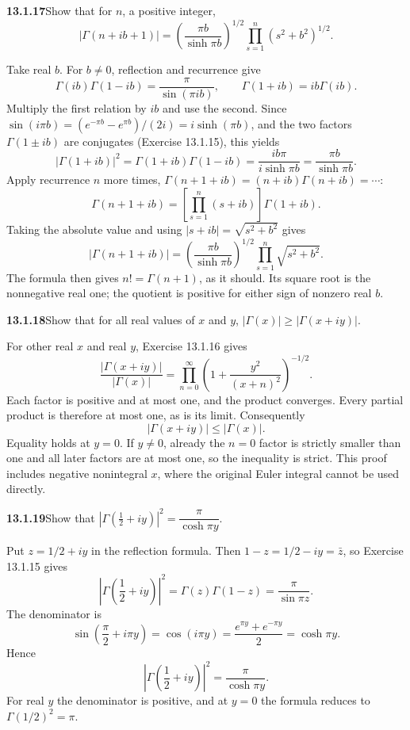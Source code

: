 \par\bigskip
\noindent\textbf{13.1.17}\quad Show that for $n$, a positive integer,
\[
|\Gamma(n+ib+1)|=\left(\frac{\pi b}{\sinh\pi b}\right)^{1/2}
\prod_{s=1}^{n}(s^{2}+b^{2})^{1/2}.
\]
\par\smallskip
{}
\solution
Take real $b$.  For $b\ne0$, reflection and recurrence give
\[
\Gamma(ib)\Gamma(1-ib)=\frac{\pi}{\sin(\pi ib)},
\qquad\Gamma(1+ib)=ib\Gamma(ib).
\]
Multiply the first relation by $ib$ and use the second.  Since
$\sin(i\pi b)=(e^{-\pi b}-e^{\pi b})/(2i)=i\sinh(\pi b)$, and the two
factors $\Gamma(1\pm ib)$ are conjugates (Exercise 13.1.15), this
yields
\[
|\Gamma(1+ib)|^2=\Gamma(1+ib)\Gamma(1-ib)
=\frac{ib\pi}{i\sinh\pi b}
=\frac{\pi b}{\sinh\pi b}.
\]
Apply recurrence $n$ more times,
$\Gamma(n+1+ib)=(n+ib)\Gamma(n+ib)=\cdots$:
\[
\Gamma(n+1+ib)=\left[\prod_{s=1}^n(s+ib)\right]\Gamma(1+ib).
\]
Taking the absolute value and using $|s+ib|=\sqrt{s^2+b^2}$ gives
\[
\boxed{|\Gamma(n+1+ib)|=
\left(\frac{\pi b}{\sinh\pi b}\right)^{1/2}
\prod_{s=1}^n\sqrt{s^2+b^2}}.
\]
  The formula then gives $n!=\Gamma(n+1)$, as it
should.  Its square root is the nonnegative real one; the quotient
is positive for either sign of nonzero real $b$.


\par\bigskip
\noindent\textbf{13.1.18}\quad Show that for all real values of $x$ and $y$,
$|\Gamma(x)|\ge|\Gamma(x+iy)|$.
\par\smallskip
{}
\solution
{}
For other real $x$ and real $y$, Exercise 13.1.16 gives
\[
\frac{|\Gamma(x+iy)|}{|\Gamma(x)|}
=\prod_{n=0}^\infty
\left(1+\frac{y^2}{(x+n)^2}\right)^{-1/2}.
\]
Each factor is positive and at most one, and the product converges.
Every partial product is therefore at most one, as is its limit.
Consequently
\[
\boxed{|\Gamma(x+iy)|\le|\Gamma(x)|}.
\]
Equality holds at $y=0$.  If $y\ne0$, already the $n=0$ factor is
strictly smaller than one and all later factors are at most one, so
the inequality is strict.  This proof includes negative nonintegral
$x$, where the original Euler integral cannot be used directly.


\par\bigskip
\noindent\textbf{13.1.19}\quad Show that
$\left|\Gamma(\tfrac{1}{2}+iy)\right|^{2}=\dfrac{\pi}{\cosh\pi y}$.
\par\smallskip
{}
\solution
Put $z=1/2+iy$ in the reflection formula.  Then
$1-z=1/2-iy=\bar z$, so Exercise 13.1.15 gives
\[
\left|\Gamma\left(\frac12+iy\right)\right|^2
=\Gamma(z)\Gamma(1-z)=\frac\pi{\sin\pi z}.
\]
The denominator is
\[
\sin\left(\frac\pi2+i\pi y\right)
=\cos(i\pi y)=\frac{e^{\pi y}+e^{-\pi y}}2
=\cosh\pi y.
\]
Hence
\[
\boxed{\left|\Gamma\left(\frac12+iy\right)\right|^2
=\frac\pi{\cosh\pi y}}.
\]
For real $y$ the denominator is positive, and at $y=0$ the formula
reduces to $\Gamma(1/2)^2=\pi$.


